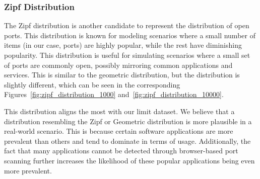 \subsubsection{Zipf Distribution}

The Zipf distribution is another candidate to represent the distribution of open ports. This distribution is known for modeling scenarios where a small number of items (in our case, ports) are highly popular, while the rest have diminishing popularity. This distribution is useful for simulating scenarios where a small set of ports are commonly open, possibly mirroring common applications and services. This is similar to the geometric distribution, but the distribution is slightly different, which can be seen in the corresponding Figures~\ref{fig:zipf_distribution_1000} and~\ref{fig:zipf_distribution_10000}. 

This distribution aligns the most with our limit dataset. We believe that a distribution resembling the Zipf or Geometric distribution is more plausible in a real-world scenario. This is because certain software applications are more prevalent than others and tend to dominate in terms of usage. Additionally, the fact that many applications cannot be detected through browser-based port scanning further increases the likelihood of these popular applications being even more prevalent.


